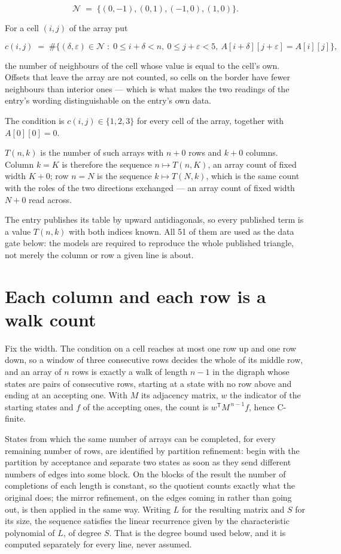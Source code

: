 \documentclass[11pt]{article}
\theoremstyle{definition}
\begin{document}
\[\mathcal{N} \;=\; \{(0,-1), (0,1), (-1,0), (1,0)\}.\]

For a cell $(i,j)$ of the array put

\[c(i,j) \;=\; \#\bigl\{(\delta,\varepsilon)\in\mathcal{N} \;:\; 0\le i+\delta<n,\ 0\le j+\varepsilon<5,\ A[i+\delta][j+\varepsilon] = A[i][j]\bigr\},\]

the number of neighbours of the cell whose value is equal to the cell's own. Offsets that leave the array are not counted, so cells on the border have fewer neighbours than interior ones --- which is what makes the two readings of the entry's wording distinguishable on the entry's own data.

The condition is $c(i,j) \in \{1, 2, 3\}$ for every cell of the array, together with $A[0][0]=0$.

$T(n,k)$ is the number of such arrays with $n + 0$ rows and $k + 0$ columns. Column $k = K$ is therefore the sequence $n \mapsto T(n,K)$, an array count of fixed width $K + 0$; row $n = N$ is the sequence $k \mapsto T(N,k)$, which is the same count with the roles of the two directions exchanged --- an array count of fixed width $N + 0$ read across.

The entry publishes its table by upward antidiagonals, so every published term is a value $T(n,k)$ with both indices known. All 51 of them are used as the data gate below: the models are required to reproduce the whole published triangle, not merely the column or row a given line is about.

\section{Each column and each row is a walk count}

Fix the width. The condition on a cell reaches at most one row up and one row down, so a window of three consecutive rows decides the whole of its middle row, and an array of $n$ rows is exactly a walk of length $n-1$ in the digraph whose states are pairs of consecutive rows, starting at a state with no row above and ending at an accepting one. With $M$ its adjacency matrix, $w$ the indicator of the starting states and $f$ of the accepting ones, the count is $w^{\mathsf T}M^{\,n-1}f$, hence C-finite.

States from which the same number of arrays can be completed, for every remaining number of rows, are identified by partition refinement: begin with the partition by acceptance and separate two states as soon as they send different numbers of edges into some block. On the blocks of the result the number of completions of each length is constant, so the quotient counts exactly what the original does; the mirror refinement, on the edges coming in rather than going out, is then applied in the same way. Writing $L$ for the resulting matrix and $S$ for its size, the sequence satisfies the linear recurrence given by the characteristic polynomial of $L$, of degree $S$. That is the degree bound used below, and it is computed separately for every line, never assumed.
\end{document}
